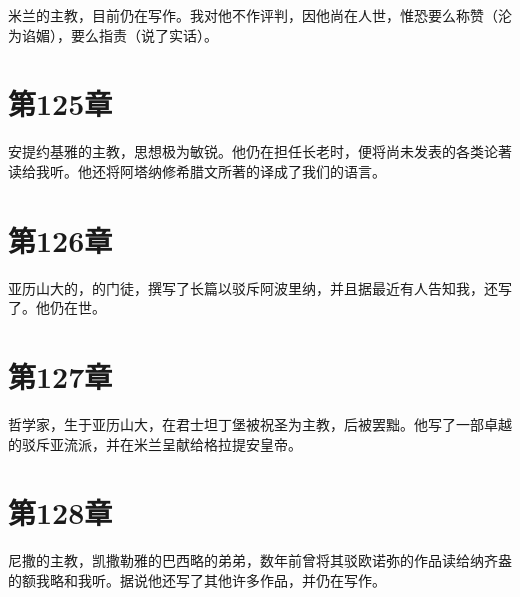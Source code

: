 米兰的主教，目前仍在写作。我对他不作评判，因他尚在人世，惟恐要么称赞（沦为谄媚），要么指责（说了实话）。\par


\section{第125章}

安提约基雅的主教，思想极为敏锐。他仍在担任长老时，便将尚未发表的各类论著读给我听。他还将阿塔纳修希腊文所著的译成了我们的语言。\par


\section{第126章}

亚历山大的，的门徒，撰写了长篇以驳斥阿波里纳，并且据最近有人告知我，还写了。他仍在世。\par


\section{第127章}

哲学家，生于亚历山大，在君士坦丁堡被祝圣为主教，后被罢黜。他写了一部卓越的驳斥亚流派，并在米兰呈献给格拉提安皇帝。\par


\section{第128章}

尼撒的主教，凯撒勒雅的巴西略的弟弟，数年前曾将其驳欧诺弥的作品读给纳齐盎的额我略和我听。据说他还写了其他许多作品，并仍在写作。\par


